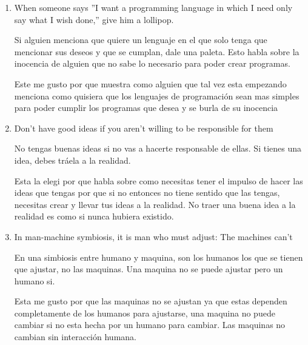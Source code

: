 \documentclass{article}
\begin{document}
\begin{enumerate}
    \item When someone says ”I want a programming language in which I need only say what I wish done,” give him a lollipop.

    Si alguien menciona que quiere un lenguaje en el que solo tenga que mencionar sus deseos y que se cumplan, dale una paleta. Esto habla sobre la inocencia de alguien que no sabe lo necesario para poder crear programas.

    Este me gusto por que muestra como alguien que tal vez esta empezando menciona como quisiera que los lenguajes de programación sean mas simples para poder cumplir los programas que desea y se burla de su inocencia
    
    \item Don’t have good ideas if you aren’t willing to be responsible for them

    No tengas buenas ideas si no vas a hacerte responsable de ellas. Si tienes una idea, debes tráela a la realidad.

    Esta la elegi por que habla sobre como necesitas tener el impulso de hacer las ideas que tengas por que si no entonces no tiene sentido que las tengas, necesitas crear y llevar tus ideas a la realidad. No traer una buena idea a la realidad es como si nunca hubiera existido. 
    
    \item In man-machine symbiosis, it is man who must adjust: The machines can’t

    En una simbiosis entre humano y maquina, son los humanos los que se tienen que ajustar, no las maquinas. Una maquina no se puede ajustar pero un humano si.

    Esta me gusto por que las maquinas no se ajustan ya que estas dependen completamente de los humanos para ajustarse, una maquina no puede cambiar si no esta hecha por un humano para cambiar. Las maquinas no cambian sin interacción humana.


\end{enumerate}
\end{document}
